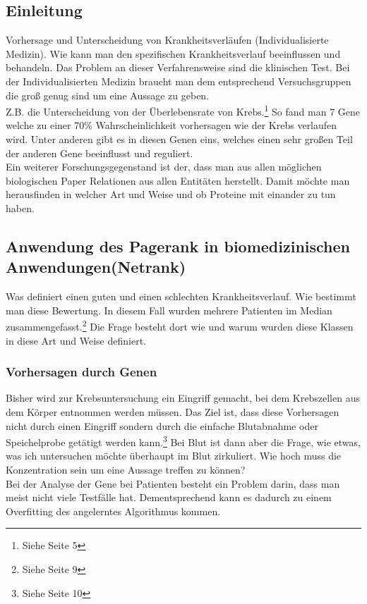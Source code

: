 \documentclass{article}
\begin{document}
\subsection{Einleitung}
Vorhersage und Unterscheidung von Krankheitsverläufen (Individualisierte Medizin). Wie kann man den spezifischen Krankheitsverlauf beeinflussen und behandeln. Das Problem an dieser Verfahrensweise sind die klinischen Test. Bei der Individualisierten Medizin braucht man dem entsprechend Versuchsgruppen die groß genug sind um eine Aussage zu geben.\\
Z.B. die Unterscheidung von der Überlebensrate von Krebs.\footnote{Siehe Seite 5} So fand man 7 Gene welche zu einer 70\% Wahrscheinlichkeit vorhersagen wie der Krebs verlaufen wird. Unter anderen gibt es in diesen Genen eins, welches einen sehr großen Teil der anderen Gene beeinflusst und reguliert.\\
Ein weiterer Forschungsgegenstand ist der, dass man aus allen möglichen biologischen Paper Relationen aus allen Entitäten herstellt. Damit möchte man herausfinden in welcher Art und Weise und ob Proteine mit einander zu tun haben.

\subsection{Anwendung des Pagerank in biomedizinischen Anwendungen(Netrank)}
Was definiert einen guten und einen schlechten Krankheitsverlauf. Wie bestimmt man diese Bewertung. In diesem Fall wurden mehrere Patienten im Median zusammengefasst.\footnote{Siehe Seite 9} Die Frage besteht dort wie und warum wurden diese Klassen in diese Art und Weise definiert.
\subsubsection{Vorhersagen durch Genen}
Bisher wird zur Krebsuntersuchung ein Eingriff gemacht, bei dem Krebszellen aus dem Körper entnommen werden müssen. Das Ziel ist, dass diese Vorhersagen nicht durch einen Eingriff sondern durch die einfache Blutabnahme oder Speichelprobe getätigt werden kann.\footnote{Siehe Seite 10} Bei Blut ist dann aber die Frage, wie etwas, was ich untersuchen möchte überhaupt im Blut zirkuliert. Wie hoch muss die Konzentration sein um eine Aussage treffen zu können?\\
Bei der Analyse der Gene bei Patienten besteht ein Problem darin, dass man meist nicht viele Testfälle hat. Dementsprechend kann es dadurch zu einem Overfitting des angelerntes Algorithmus kommen.
\end{document}
